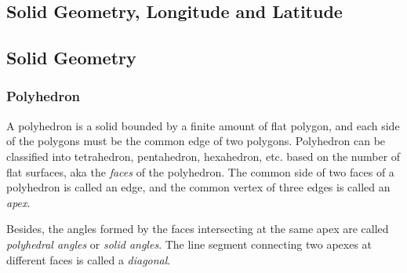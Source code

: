 \documentclass{report}
\begin{document}
\begin{multicols}{2}
      \chapter{Solid Geometry, Longitude and Latitude}

    \section{Solid Geometry}

    \subsection*{Polyhedron}

    A polyhedron is a solid bounded by a finite amount of flat polygon, and each
    side of the polygons must be the common edge of two polygons. Polyhedron can be
    classified into tetrahedron, pentahedron, hexahedron, etc. based on the number
    of flat surfaces, aka the \emph{faces} of the polyhedron. The common side of
    two faces of a polyhedron is called an edge, and the common vertex of three
    edges is called an \emph{apex}.

    Besides, the angles formed by the faces intersecting at the same apex are
    called \emph{polyhedral angles} or \emph{solid angles}. The line segment
    connecting two apexes at different faces is called a \emph{diagonal}.


\end{multicols}
\end{document}
